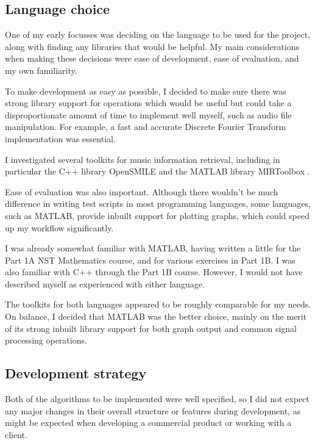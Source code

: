 \documentclass[12pt,a4paper,twoside,openright]{report}
\begin{document}
\subsection{Language choice}

One of my early focusses was deciding on the language to be used for the project, along with finding any libraries that would be helpful. My main considerations when making these decisions were ease of development, ease of evaluation, and my own familiarity.

To make development as easy as possible, I decided to make sure there was strong library support for operations which would be useful but could take a disproportionate amount of time to implement well myself, such as audio file manipulation. For example, a fast and accurate Discrete Fourier Transform implementation was essential.

I investigated several toolkits for music information retrieval, including in particular the C++ library OpenSMILE \cite{Eyben10} and the MATLAB library MIRToolbox \cite{Lartillot07}.

Ease of evaluation was also important. Although there wouldn't be much difference in writing test scripts in most programming languages, some languages, such as MATLAB, provide inbuilt support for plotting graphs, which could speed up my workflow significantly.

I was already somewhat familiar with MATLAB, having written a little for the Part 1A NST Mathematics course, and for various exercises in Part 1B. I was also familiar with C++ through the Part 1B course. However, I would not have described myself as experienced with either language.

The toolkits for both languages appeared to be roughly comparable for my needs. On balance, I decided that MATLAB was the better choice, mainly on the merit of its strong inbuilt library support for both graph output and common signal processing operations.


\subsection{Development strategy}
\label{section:devstrat}

Both of the algorithms to be implemented were well specified, so I did not expect any major changes in their overall structure or features during development, as might be expected when developing a commercial product or working with a client. 
\end{document}
